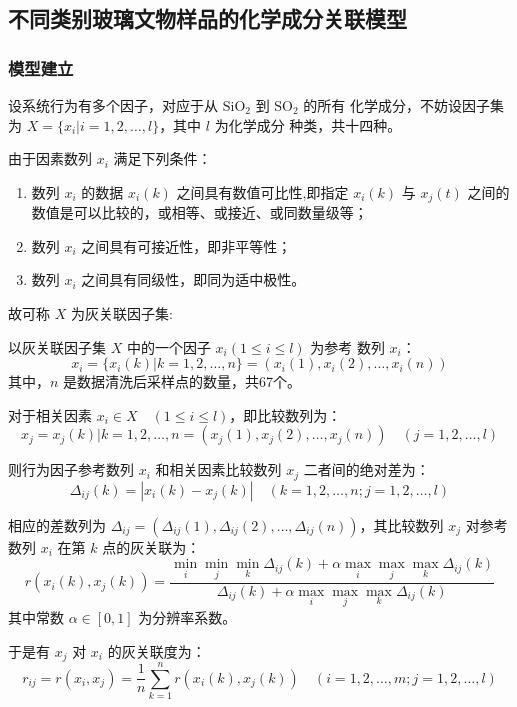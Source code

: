 \documentclass[withoutpreface,bwprint]{cumcmthesis} %
\begin{document}
\subsection{不同类别玻璃文物样品的化学成分关联模型}\label{sec:associationModel}%
\subsubsection{模型建立}
设系统行为有多个因子，对应于从 $\mathrm{SiO_2}$ 到 $\mathrm{SO_2}$ 的所有
化学成分，不妨设因子集为 $X=\{x_i |i=1,2,\dots,l\}$，其中 $l$ 为化学成分
种类，共十四种。

由于因素数列 $x_i$ 满足下列条件：
\begin{enumerate}
    \item 数列 $x_i$ 的数据 $x_i(k)$ 之间具有数值可比性,即指定 $x_i(k)$ 与
    $x_j(t)$ 之间的数值是可以比较的，或相等、或接近、或同数量级等；
    \item 数列 $x_i$ 之间具有可接近性，即非平等性；
    \item 数列 $x_i$ 之间具有同级性，即同为适中极性。
\end{enumerate}

故可称 $X$ 为灰关联因子集:

以灰关联因子集 $X$ 中的一个因子 $x_i(1\leqslant i\leqslant l)$ 为参考
数列 $x_i$：
\[
    x_i=\{x_i(k)|k=1,2,\dots,n\}=(x_i(1),x_i(2),\dots,x_i(n)) 
\]
\indent 其中，$n$ 是数据清洗后采样点的数量，共67个。

对于相关因素 $x_i\in X\quad(1\leqslant i\leqslant l)$，即比较数列为：
\[
    x_j={x_j(k)|k=1,2,\dots,n}=(x_j(1),x_j(2),\dots,x_j(n))\quad (j=1,2,\dots,l)
\]

则行为因子参考数列 $x_i$ 和相关因素比较数列 $x_j$ 二者间的绝对差为：
\[
    \Delta_{ij}(k)=|x_i(k)-x_j(k)|\quad (k=1,2,\dots,n;j=1,2,\dots,l)
\]

相应的差数列为 $\Delta_{ij}=(\Delta_{ij}(1),\Delta_{ij}(2),\dots,
\Delta_{ij}(n))$，其比较数列 $x_j$ 对参考数列 $x_i$ 在第 $k$ 点的灰关联为：
\[
    r(x_i(k),x_j(k))=\frac{\displaystyle\min_i\min_j\min_k\Delta_{ij}(k) +
     \alpha\max_i\max_j\max_k\Delta_{ij}(k)}{\displaystyle\Delta_{ij}(k) +
     \alpha\max_i\max_j\max_k\Delta_{ij}(k)}
\]
\indent 其中常数 $\alpha\in[0,1]$ 为分辨率系数。

于是有 $x_j$ 对 $x_i$ 的灰关联度为：
\begin{equation}
    r_{ij}=r(x_i,x_j)=\frac{1}{n}\sum_{k=1}^nr(x_i(k),x_j(k))\quad
    (i=1,2,\dots,m;j=1,2,\dots,l)
    \label{eq:4-0}
\end{equation}
\end{document}
